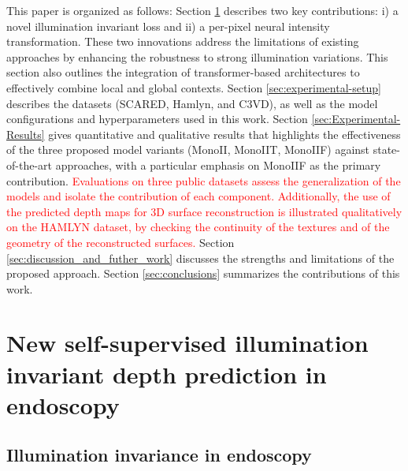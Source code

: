 \documentclass[a4paper,fleqn]{cas-dc}
\begin{document}
This paper is organized as follows: Section \ref{sec:methods_and_data} describes two key contributions: i) a novel illumination invariant loss and ii) a per-pixel neural intensity transformation. These two innovations address the limitations of existing approaches by enhancing the robustness to strong illumination variations. This section also outlines the integration of transformer-based architectures to effectively combine local and global contexts. Section \ref{sec:experimental-setup} describes the datasets (SCARED, Hamlyn, and C3VD), as well as the model configurations and hyperparameters used in this work. Section \ref{sec:Experimental-Results} gives quantitative and qualitative results that highlights the effectiveness of the three proposed model variants (MonoII, MonoIIT, MonoIIF) against state-of-the-art approaches, with a particular emphasis on MonoIIF as the primary contribution. \textcolor{red}{Evaluations on three public datasets assess the generalization of the models and isolate the contribution of each component. Additionally, the use of the predicted depth maps for 3D surface reconstruction is illustrated qualitatively on the HAMLYN dataset, by checking the continuity of the textures and of the geometry of the reconstructed surfaces.} Section \ref{sec:discussion_and_futher_work} discusses the strengths and limitations of the proposed approach. Section \ref{sec:conclusions} summarizes the contributions of this work. 

\section{New self-supervised illumination invariant
 depth prediction in endoscopy}
\label{sec:methods_and_data}

\subsection{Illumination invariance in endoscopy \label{sec:illumination_models}}
\end{document}
